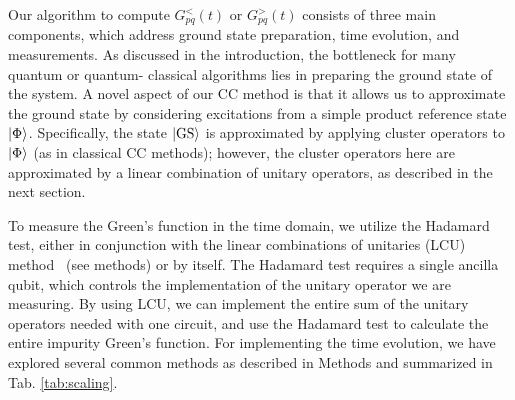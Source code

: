 \documentclass[aip,reprint,table,xcdraw,usenames,dvipsnames]{revtex4-1}
\begin{document}
Our algorithm to compute $G_{pq}^{<}(t)$ or $G_{pq}^{>}(t)$ consists of three main components, which address ground state preparation, time evolution, and measurements. 
As discussed in the introduction, the bottleneck for many quantum or quantum-
classical algorithms lies in preparing the ground state of the system. 
A novel aspect of our CC method is that it allows us to approximate the ground state by considering excitations from a simple product reference state $\ket{\Phi}$.  Specifically, the state $\ket{\rm GS}$ is approximated by applying cluster operators to $\ket{\Phi}$ (as in classical CC methods); however, the cluster operators here are approximated by a linear combination of unitary operators, as described in the next 
section.   

To measure the Green's function in the time domain, we utilize the Hadamard test, either in conjunction with the linear combinations of unitaries (LCU) method~\cite{Childs2012} (see methods) or by itself. The Hadamard test requires a single ancilla qubit, which controls the implementation of the unitary operator we are measuring. By using LCU, we can implement the entire sum of the unitary operators needed with one circuit, and use the Hadamard test to calculate the entire impurity Green's function. For implementing the time evolution, we have explored several common methods as described in Methods and summarized in Tab. \ref{tab:scaling}. 

\end{document}
